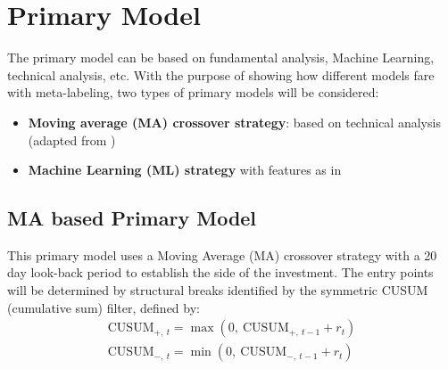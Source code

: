 \documentclass[a4paper]{report}
\begin{document}
\begin{comment}
The primary model hinted that a long position should be opened. 
However, the secondary model evaluated the choice of the primary model 
and decided not to open the position, since it did not meet the 
principal criteria: exceeding the threshold. Note that the threshold 
column in table \ref{table:exMetalabeling} will be determined in a way 
that maximizes a carefully chosen performance metric.\\

Summing all up:

\begin{itemize}
	\item Develop a primary model (M1) that determines the side 
	of a trade
	\item \textbf{Whenever M1 says that one should open a position}, 
	determine whether M1 gave a correct output or it was wrong 
	(\textbf{meta-labeling $\equiv$ labeling a model})
	\item With the output of M1, a set of features (they can be the 
	same) and the previous labels develop a secondary model (M2)
	\item If M1 tells you to trade and M2's prediction surpasses the 
	threshold of M2, open a position with the side given from M1.
\end{itemize}

\end{comment}

\section{Primary Model}
\label{sec:primaryModel}
The primary model can be based on fundamental analysis, Machine Learning, 
technical analysis, etc. With the purpose of showing how different models 
fare with meta-labeling, two types of primary models will be considered: 

\begin{itemize}
	\item \textbf{Moving average (MA) crossover strategy}: based on technical 
	analysis (adapted from \cite{glabadanidis2015market, 
	zakamulin2018revisiting})
	
	\item \textbf{Machine Learning (ML) strategy} with features as in 
	\cite{metaLabelingSignalEfficacy}
\end{itemize}

\subsection{MA based Primary Model}
\label{sec:MAPrimaryModel}
This primary model uses a Moving Average (MA) crossover strategy with a 20 
day look-back period to establish the side of the investment. The entry 
points will be determined by structural breaks identified by the symmetric 
CUSUM (cumulative sum) filter, defined by:
\begin{gather*}
	\text{CUSUM}_{+,\ t} = \max \left( 0,\ \text{CUSUM}_{+,\ t-1} + 
	r_t \right)\\	
	\text{CUSUM}_{-,\ t} = \min \left( 0,\ \text{CUSUM}_{-,\ t-1} + 
	r_t \right)
\end{gather*}
\end{document}
